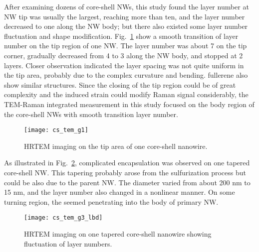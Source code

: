 After examining dozens of core-shell NWs, this study found the  layer number at NW tip was usually the largest, reaching more than ten, and the layer number decreased to one along the NW body; but there also existed some layer number fluctuation and shape modification. Fig.~\ref{fig:ch5ws2tem3} show a smooth transition of  layer number on the tip region of one NW. The layer number was about 7 on the tip corner, gradually decreased from 4 to 3 along the NW body, and stopped at 2 layers. Closer observation indicated the layer spacing was not quite uniform in the tip area, probably due to the complex curvature and bending.  fullerene also show similar structures. Since the closing of the tip region could be of great complexity and the induced strain could modify Raman signal considerably, the TEM-Raman integrated measurement in this study focused on the body region of the core-shell NWs with smooth transition layer number.
\begin{figure}[htb]
\centering
\texttt{[image: cs\_tem\_g1]}
\caption[HRTEM imaging on the tip area of one core-shell nanowire]{HRTEM imaging on the tip area of one core-shell nanowire.}
\label{fig:ch5ws2tem3}
\end{figure}
As illustrated in Fig.~\ref{fig:ch5ws2tem4}, complicated  encapsulation was observed on one tapered core-shell NW. This tapering probably arose from the sulfurization process but could be also due to the parent  NW. The diameter varied from about 200 nm to 15 nm, and the  layer number also changed in a nonlinear manner. On some turning region, the  seemed penetrating into the body of primary  NW. 
\begin{figure}[htb]
\centering
\texttt{[image: cs\_tem\_g3\_lbd]}
\caption[HRTEM imaging on one tapered core-shell nanowire]{HRTEM imaging on one tapered core-shell nanowire showing fluctuation of layer numbers.}
\label{fig:ch5ws2tem4}
\end{figure}

